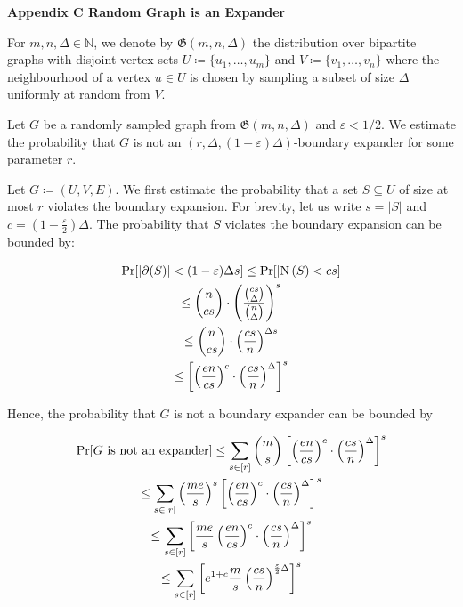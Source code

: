 \documentclass[10pt,a4paper]{article}
\begin{document}
\par\medskip\noindent\textbf{
Appendix C Random Graph is an Expander}\par




For $m,n,\Delta\in\mathbb{N}$, we denote by $\mathfrak{G}(m,n,\Delta)$ the distribution over
bipartite graphs with disjoint vertex sets $U\coloneqq\{u_{1},\dots,u_{m}\}$ and $V\coloneqq\{v_{1},\dots,v_{n}\}$ where the neighbourhood of a vertex $u\in U$ is chosen by sampling a subset of size
$\Delta$ uniformly at random from $V$.\par




Let $G$ be a randomly sampled graph from $\mathfrak{G}(m,n,\Delta)$ and $\varepsilon<1/2$. We
estimate the probability that $G$ is not an $(r,\Delta,(1-\varepsilon)\Delta)$-boundary expander
for some parameter $r$.\par




Let $G\coloneqq(U,V,E)$. We first estimate the probability that a set $S\subseteq U$ of size at most
$r$ violates the boundary expansion. For brevity, let us write $s=|S|$ and $c=(1-\frac{\varepsilon}{2})\Delta$. The probability that $S$ violates the boundary expansion can be bounded
by:\par


\[\begin{gathered}
\displaystyle\Pr[|\partial(S)|<(1-\varepsilon)\Delta s] \displaystyle\leq\Pr[|\mathrm{N}\left(S\right)<cs] \\
\displaystyle\leq\binom{n}{cs}\cdot\left(\frac{\binom{cs}{\Delta}}{\binom{n}{%
\Delta}}\right)^{s} \\
\displaystyle\leq\binom{n}{cs}\cdot\left(\frac{cs}{n}\right)^{\Delta s} \\
\displaystyle\leq\left[\left(\frac{en}{cs}\right)^{c}\cdot\left(\frac{cs}{n}%
\right)^{\Delta}\right]^{s}
\end{gathered}\]


Hence, the probability that $G$ is not a boundary expander can be bounded by\par


\[\begin{gathered}
\displaystyle\Pr[G\text{ is not an expander}] \displaystyle\leq\sum\limits_{s\in[r]}\binom{m}{s}\left[\left(\frac{en}{cs}%
\right)^{c}\cdot\left(\frac{cs}{n}\right)^{\Delta}\right]^{s} \\
\displaystyle\leq\sum\limits_{s\in[r]}\left(\frac{me}{s}\right)^{s}\left[\left%
(\frac{en}{cs}\right)^{c}\cdot\left(\frac{cs}{n}\right)^{\Delta}\right]^{s} \\
\displaystyle\leq\sum\limits_{s\in[r]}\left[\frac{me}{s}\left(\frac{en}{cs}%
\right)^{c}\cdot\left(\frac{cs}{n}\right)^{\Delta}\right]^{s} \\
\displaystyle\leq\sum\limits_{s\in[r]}\left[e^{1+c}\frac{m}{s}\left(\frac{cs}{%
n}\right)^{\frac{\varepsilon}{2}\Delta}\right]^{s}
\end{gathered}\]
\end{document}

